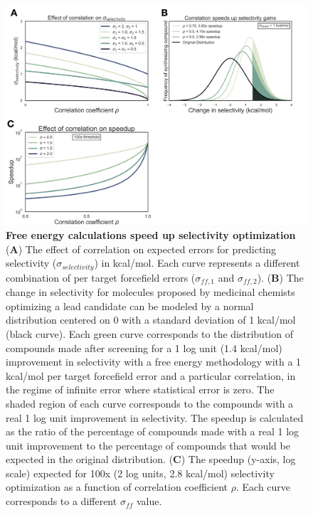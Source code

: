 \documentclass[9pt,lineno]{elife-modified} %
\begin{document}
\begin{figure}
\begin{fullwidth}
\begin{centering}
\includegraphics[width=1.0\linewidth]{figures/figure1.png}
\end{centering}
\caption{
\label{fig:figure-1}
{\bf Free energy calculations speed up selectivity optimization} \\
({\bf A})  The effect of correlation on expected errors for predicting selectivity ($\sigma_{selectivity}$) in kcal/mol. Each curve represents a different combination of per target forcefield errors ($\sigma_{ff,1}$ and $\sigma_{ff,2}$). 
({\bf B}) The change in selectivity for molecules proposed by medicinal chemists optimizing a lead candidate can be modeled by a normal distribution centered on 0 with a standard deviation of 1 kcal/mol (black curve). Each green curve corresponds to the distribution of compounds made after screening for a 1 log unit (1.4 kcal/mol) improvement in selectivity with a free energy methodology with a 1 kcal/mol per target forcefield error and a particular correlation, in the regime of infinite error where statistical error is zero. The shaded region of each curve corresponds to the compounds with a real 1 log unit  improvement in selectivity. The speedup is calculated as the ratio of the percentage of compounds made with a real 1 log unit improvement to the percentage of compounds that would be expected in the original distribution.  
({\bf C}) The speedup (y-axis, log scale) expected for 100x (2 log units, 2.8 kcal/mol) selectivity optimization as a function of correlation coefficient $\rho$. Each curve corresponds to a different $\sigma_{ff}$ value.  
}
\end{fullwidth}
\end{figure}
\end{document}
